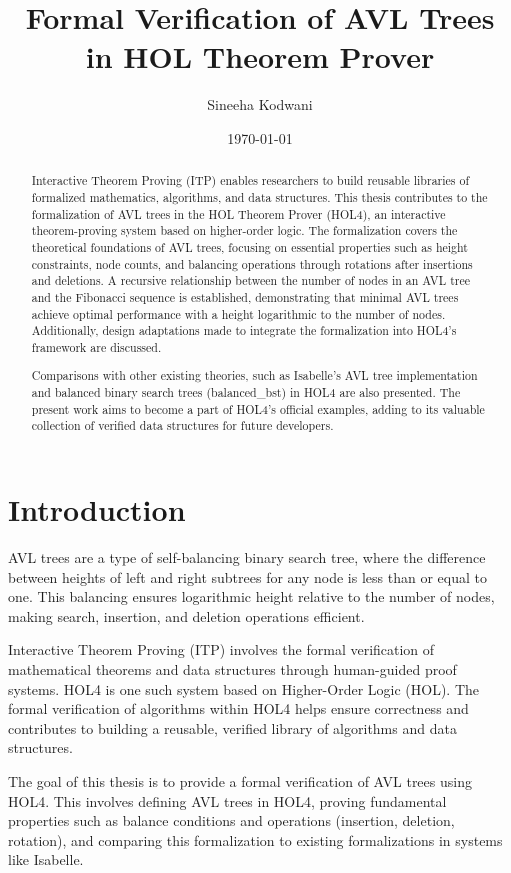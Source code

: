 \documentclass[12pt]{article}
\title{Formal Verification of AVL Trees in HOL Theorem Prover}
\author{Sineeha Kodwani}
\date{\today}
\begin{document}
\maketitle

\begin{abstract}
Interactive Theorem Proving (ITP) enables researchers to build reusable libraries of formalized mathematics, algorithms, and data structures. This thesis contributes to the formalization of AVL trees in the HOL Theorem Prover (HOL4), an interactive theorem-proving system based on higher-order logic. The formalization covers the theoretical foundations of AVL trees, focusing on essential properties such as height constraints, node counts, and balancing operations through rotations after insertions and deletions. A recursive relationship between the number of nodes in an AVL tree and the Fibonacci sequence is established, demonstrating that minimal AVL trees achieve optimal performance with a height logarithmic to the number of nodes. Additionally, design adaptations made to integrate the formalization into HOL4’s framework are discussed.

Comparisons with other existing theories, such as Isabelle's AVL tree implementation and balanced binary search trees (balanced\_bst) in HOL4 are also presented. The present work aims to become a part of HOL4's official examples, adding to its valuable collection of verified data structures for future developers.
\end{abstract}

\section{Introduction}
AVL trees are a type of self-balancing binary search tree, where the difference between heights of left and right subtrees for any node is less than or equal to one. This balancing ensures logarithmic height relative to the number of nodes, making search, insertion, and deletion operations efficient.

Interactive Theorem Proving (ITP) involves the formal verification of mathematical theorems and data structures through human-guided proof systems. HOL4 is one such system based on Higher-Order Logic (HOL). The formal verification of algorithms within HOL4 helps ensure correctness and contributes to building a reusable, verified library of algorithms and data structures.

The goal of this thesis is to provide a formal verification of AVL trees using HOL4. This involves defining AVL trees in HOL4, proving fundamental properties such as balance conditions and operations (insertion, deletion, rotation), and comparing this formalization to existing formalizations in systems like Isabelle.
\end{document}

